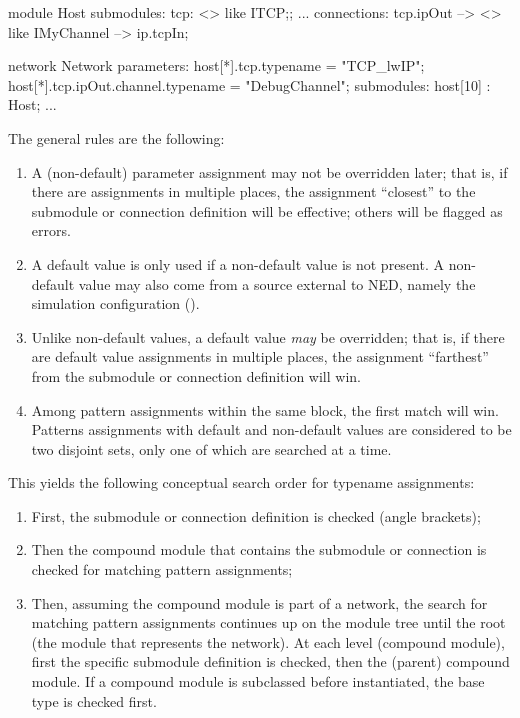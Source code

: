 \begin{ned}
module Host {
    submodules:
        tcp: <> like ITCP;;
        ...
    connections:
        tcp.ipOut --> <> like IMyChannel --> ip.tcpIn;
}

network Network {
    parameters:
        host[*].tcp.typename = "TCP_lwIP";
        host[*].tcp.ipOut.channel.typename = "DebugChannel";
    submodules:
        host[10] : Host;
        ...
}
\end{ned}

The general rules are the following:

\begin{enumerate}
  \item A (non-default) parameter assignment may not be overridden later;
    that is, if there are assignments in multiple places, the assignment
    ``closest'' to the submodule or connection definition will be effective;
    others will be flagged as errors.
  \item A default value is only used if a non-default value is not present.
    A non-default value may also come from a source external to NED, namely
    the simulation configuration ().
  \item Unlike non-default values, a default value \textit{may} be overridden;
    that is, if there are default value assignments in multiple places,
    the assignment ``farthest'' from the submodule or connection definition will win.
  \item Among pattern assignments within the same 
    block, the first match will win. Patterns assignments with default and
    non-default values are considered to be two disjoint sets, only one of
    which are searched at a time.
\end{enumerate}

This yields the following conceptual search order for typename assignments:

\begin{enumerate}
   \item First, the submodule or connection definition is checked (angle brackets);
   \item Then the compound module that contains the submodule or connection is
     checked for matching pattern assignments;
   \item Then, assuming the compound module is part of a network, the search
     for matching pattern assignments continues up on the module tree until the root
     (the module that represents the network). At each level (compound module),
     first the specific submodule definition is checked, then the (parent) compound module.
     If a compound module is subclassed before instantiated, the base type is checked
     first.
\end{enumerate}

